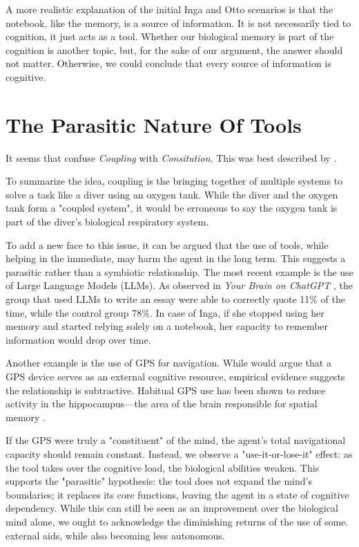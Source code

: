 \documentclass[12pt]{article}
\begin{document}
A more realistic explanation of the initial Inga and Otto scenarios is that the 
notebook, like the memory, is a source of information. It is not necessarily tied to
cognition, it just acts as a tool. Whether our biological memory is part of the cognition
is another topic, but, for the sake of our argument, the answer should not matter. Otherwise, 
we could conclude that every source of information is cognitive.


\section{The Parasitic Nature Of Tools}
It seems that \textcite{clark1998extended} confuse \textit{Coupling} with \textit{Consitution}. This was 
best described by \textcite{adams2001bounds}.

To summarize the idea, coupling is the bringing together of multiple systems to solve a task 
\textemdash like a diver using an oxygen tank. While the diver and the oxygen tank form a "coupled
system", it would be erroneous to say the oxygen tank is part of the diver's biological 
respiratory system.

To add a new face to this issue, it can be argued that the use of tools, while helping in the
immediate, may harm the agent in the long term. This suggests a parasitic rather than a symbiotic
relationship. The most recent example is the use of Large Language Models (LLMs). 
As observed in \textit{Your Brain on ChatGPT} \parencite{kosmyna2025chatgpt}, the group that used LLMs to write an
essay were able to correctly quote 11\% of the time, while the control group 78\%.
In case of Inga, if she stopped using her memory and started relying solely on a notebook, her capacity
to remember information would drop over time.  

Another example is the use of GPS for navigation. While \textcite{clark1998extended} would argue that 
a GPS device serves as an external cognitive resource, empirical evidence suggests the 
relationship is subtractive. Habitual GPS use has been shown to reduce activity in the 
hippocampus—the area of the brain responsible for spatial memory \parencite{dahmani2020gps}.

If the GPS were truly a "constituent" of the mind, the agent's total navigational capacity 
should remain constant. Instead, we observe a "use-it-or-lose-it" effect: as the tool takes over 
the cognitive load, the biological abilities weaken. This supports the "parasitic" 
hypothesis: the tool does not expand the mind's boundaries; it replaces its core functions, 
leaving the agent in a state of cognitive dependency. While this can still be seen as an improvement
over the biological mind alone, we ought to acknowledge the diminishing returns of the use of some.
external aids, while also becoming less autonomous.
\end{document}
